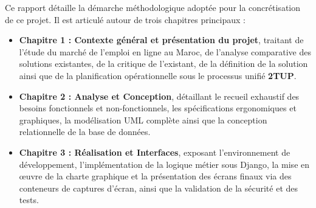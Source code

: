 Ce rapport détaille la démarche méthodologique adoptée pour la concrétisation de ce projet. Il est articulé autour de trois chapitres principaux :
\begin{itemize}
    \item \textbf{Chapitre 1 : Contexte général et présentation du projet}, traitant de l'étude du marché de l'emploi en ligne au Maroc, de l'analyse comparative des solutions existantes, de la critique de l'existant, de la définition de la solution ainsi que de la planification opérationnelle sous le processus unifié \textbf{2TUP}.
    \item \textbf{Chapitre 2 : Analyse et Conception}, détaillant le recueil exhaustif des besoins fonctionnels et non-fonctionnels, les spécifications ergonomiques et graphiques, la modélisation UML complète ainsi que la conception relationnelle de la base de données.
    \item \textbf{Chapitre 3 : Réalisation et Interfaces}, exposant l'environnement de développement, l'implémentation de la logique métier sous Django, la mise en œuvre de la charte graphique et la présentation des écrans finaux via des conteneurs de captures d'écran, ainsi que la validation de la sécurité et des tests.
\end{itemize}
\newpage
